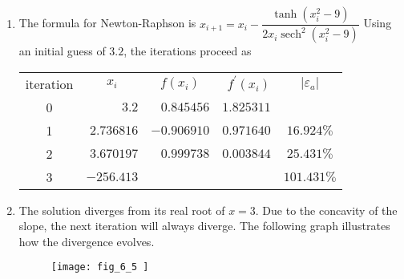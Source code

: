 \documentclass[../main.tex]{subfiles}
\begin{document}
\section{}
\begin{enumerate}[label=\bfseries(\alph*)]
\item The formula for Newton-Raphson is
\bigbreak
$x_{i+1}=x_{i}-\dfrac{\tanh \left(x_{i}^{2}-9\right)}{2 x_{i} \operatorname{sech}^{2}\left(x_{i}^{2}-9\right)}$
\bigbreak
Using an initial guess of $3.2$, the iterations proceed as
\bigbreak
\begin{tabular}{crrrc}
iteration & \multicolumn{1}{c}{$x_{i}$} & \multicolumn{1}{c}{$f\left(x_{i}\right)$} & $f^{\prime}\left(x_{i}\right)$ & $\left|\varepsilon_{a}\right|$ \\
0 & $3.2$ & $0.845456$ & $1.825311$ &  \\
1 & $2.736816$ & $-0.906910$ & $0.971640$ & $16.924 \%$ \\
2 & $3.670197$ & $0.999738$ & $0.003844$ & $25.431 \%$ \\ 
3 & $-256.413$ & & & $ 101.431 \%$
\end{tabular}
\bigbreak
\item The solution diverges from its real root of $x=3$. Due to the concavity of the slope, the next iteration will always diverge. The following graph illustrates how the divergence evolves.
\bigbreak
\begin{figure}[H]
		\texttt{[image: fig\_6\_5 ]}
		\label{fig:fig_6_5}
	\end{figure}
	\bigbreak



\end{enumerate}
\end{document}
